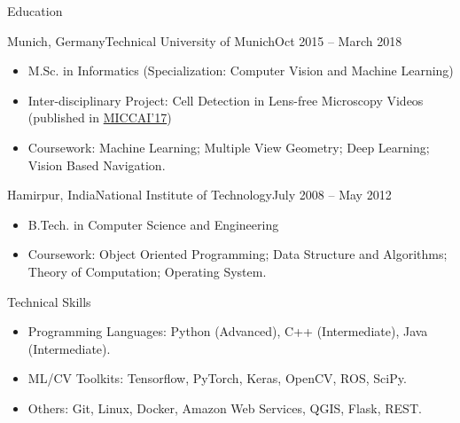 \documentclass[]{mcdowellcv}
\begin{document}
	\begin{cvsection}{Education}
	\begin{cvsubsection}{Munich, Germany}{Technical University of Munich}{Oct 2015 -- March 2018}
		\begin{itemize}
			\item M.Sc. in Informatics (Specialization: Computer Vision and Machine Learning)
			\item Inter-disciplinary Project: Cell Detection in Lens-free Microscopy Videos (published in \href{https://link.springer.com/chapter/10.1007/978-3-319-66185-8_1}{MICCAI'17})
			\item Coursework: Machine Learning; Multiple View Geometry; Deep Learning; Vision Based Navigation.
		\end{itemize}
	\end{cvsubsection}
	\begin{cvsubsection}{Hamirpur, India}{National Institute of Technology}{July 2008 -- May 2012}
		\begin{itemize}
			\item B.Tech. in Computer Science and Engineering
			\item Coursework: Object Oriented Programming; Data Structure and Algorithms; Theory of Computation; Operating System.
		\end{itemize}
	\end{cvsubsection}
	\end{cvsection}

\begin{cvsection}{Technical Skills}
	\begin{cvsubsection}{}{}{}    
		\begin{itemize}
			\item Programming Languages: Python (Advanced), C++ (Intermediate), Java (Intermediate).
			\item ML/CV Toolkits: Tensorflow, PyTorch, Keras, OpenCV, ROS, SciPy.
			\item Others: Git, Linux, Docker, Amazon Web Services, QGIS, Flask, REST.
		\end{itemize}
	\end{cvsubsection}
\end{cvsection}


	
\end{document}
